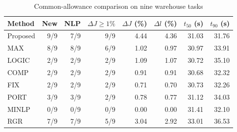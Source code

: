 \begin{table}[!t]
\centering\caption{Common-allowance comparison on nine warehouse tasks}
\label{tab:main}
\footnotesize\begin{tabular}{lrrrrrrr}
\toprule
Method & New & NLP & $\Delta J\geq1\%$ & $\Delta J$ (\%) & $\Delta l$ (\%) & $t_{50}$ (s) & $t_{90}$ (s)\\
\midrule
Proposed & 9/9 & 7/9 & 9/9 & 4.44 & 4.36 & 31.03 & 31.76\\
MAX & 8/9 & 8/9 & 6/9 & 1.02 & 0.97 & 30.97 & 33.91\\
LOGIC & 2/9 & 2/9 & 2/9 & 1.09 & 1.07 & 30.72 & 35.10\\
COMP & 2/9 & 2/9 & 2/9 & 0.91 & 0.91 & 30.68 & 32.32\\
FIX & 2/9 & 2/9 & 2/9 & 0.71 & 0.70 & 30.73 & 32.26\\
PORT & 3/9 & 3/9 & 2/9 & 0.78 & 0.77 & 31.12 & 34.03\\
MINLP & 0/9 & 0/9 & 0/9 & 0.00 & 0.00 & 31.41 & 32.10\\
RGR & 7/9 & 7/9 & 5/9 & 3.04 & 2.92 & 33.01 & 36.53\\
\bottomrule\end{tabular}
\end{table}
